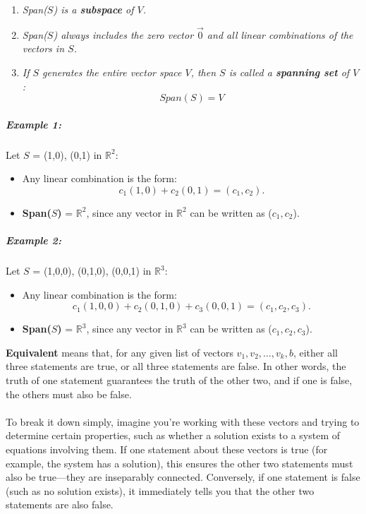 \documentclass[a4paper,12pt]{article}
\begin{document}
\begin{enumerate}
    \item \textit{Span(\(S\)) is a \textbf{subspace} of \(V\).}
    \item \textit{Span(\(S\)) always includes the zero vector $\vec{0}$ and all linear combinations of the vectors in \(S\).}
    \item \textit{If \(S\) generates the entire vector space \(V\), then \(S\) is called a \textbf{spanning set} of \(V\):\\}
    \[
    Span(S) = V
    \]
\end{enumerate}
\subparagraph{Example 1:} Let \(S\) = {(1,0), (0,1)} in \(\mathbb{R}^2\):
\begin{itemize}
    \item Any linear combination is the form:\\
    \[
    c_1(1,0) + c_2(0,1) = (c_1, c_2).
    \]
    \item \textbf{Span(\(S\))} = \(\mathbb{R}^2\), since any vector in \(\mathbb{R}^2\) can be written as (\(c_1, c_2\)).
\end{itemize}

\subparagraph{Example 2:} Let \(S\) = {(1,0,0), (0,1,0), (0,0,1)} in \(\mathbb{R}^3\):
\begin{itemize}
    \item Any linear combination is the form:\\
    \[
    c_1(1,0,0) + c_2(0,1,0) + c_3(0,0,1) = (c_1, c_2, c_3).
    \]
    \item \textbf{Span(\(S\))} = \(\mathbb{R}^3\), since any vector in \(\mathbb{R}^3\) can be written as (\(c_1, c_2, c_3\)).\\
\end{itemize}

\textbf{Equivalent} means that, for any given list of vectors \(v_1, v_2,\dots, v_k, b\), either all three statements are true, or all three statements are false. In other words, the truth of one statement guarantees the truth of the other two, and if one is false, the others must also be false.\\\\
To break it down simply, imagine you’re working with these vectors and trying to determine certain properties, such as whether a solution exists to a system of equations involving them. If one statement about these vectors is true (for example, the system has a solution), this ensures the other two statements must also be true—they are inseparably connected. Conversely, if one statement is false (such as no solution exists), it immediately tells you that the other two statements are also false.\\
\end{document}

